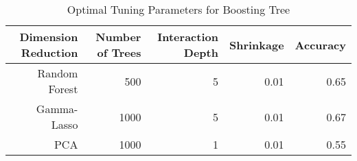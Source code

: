 \begin{table}[ht]
\centering
\caption{Optimal Tuning Parameters for Boosting Tree} 
\label{tab:boost_tune}
\begin{tabular}{rrrrr}
  \hline
Dimension Reduction & Number of Trees & Interaction Depth & Shrinkage & Accuracy \\ 
  \hline
Random Forest & 500 &   5 & 0.01 & 0.65 \\ 
  Gamma-Lasso & 1000 &   5 & 0.01 & 0.67 \\ 
  PCA & 1000 &   1 & 0.01 & 0.55 \\ 
   \hline
\end{tabular}
\end{table}
